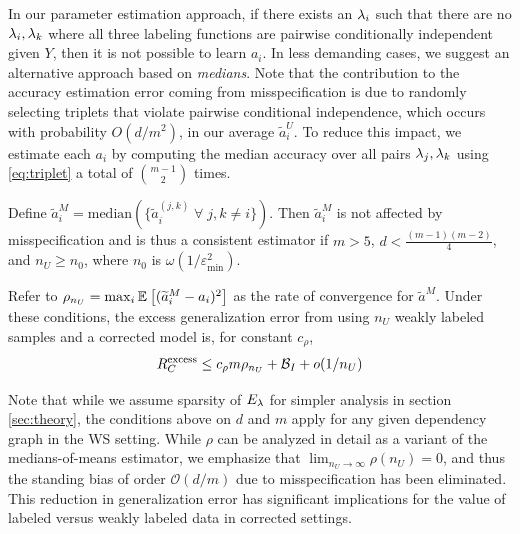 In our parameter estimation approach, if there exists an $\lambda_i$ such that there are no $\lambda_i, \lambda_k$ where all three labeling functions are pairwise conditionally independent given $Y$, then it is not possible to learn  $a_i$. In less demanding cases, %
we suggest an alternative approach based on \emph{medians}. Note that the contribution to the accuracy estimation error coming from misspecification is due to randomly selecting triplets that violate pairwise conditional independence, which occurs with probability $O(d/m^2)$, 
in our average $\widetilde{a}_i^U$. To reduce this impact, we estimate each $a_i$ by computing the median accuracy over all pairs $\lambda_j, \lambda_k$ using \eqref{eq:triplet} a total of ${m - 1 \choose 2}$ times.
\begin{proposition}
Define $\widetilde{a}_i^M = \mathrm{median}(\{\widetilde{a}_i^{(j, k)} \; \forall \; j, k \neq i \})$. Then $\widetilde{a}_i^M$ is not affected by misspecification and is thus a consistent estimator if $m > 5$, $d < \frac{(m - 1)(m - 2)}{4}$, and $n_U \ge n_0$, where $n_0$ is $\omega(1/\varepsilon_{\min}^2)$.

Refer to $\rho_{n_U} = \max_i \mathbb{E}_{}\left[(\widetilde{a}_i^M - a_i)^2\right]$ as the rate of convergence for $\widetilde{a}^M$. Under these conditions, the excess generalization error from using $n_U$ weakly labeled samples and a corrected model is, for constant $c_\rho$,
\begin{align}
    R_C^{\mathrm{excess}} \le c_\rho m  \rho_{n_U} + \mathcal{B}_I + o(1/n_U)
\end{align}
\label{prop:medians}
\end{proposition}

Note that while we assume sparsity of $E_{\lambda}$ for simpler analysis in section \ref{sec:theory}, the conditions above on $d$ and $m$ apply for any given dependency graph in the WS setting. While $\rho$ can be analyzed in detail as a variant of the medians-of-means estimator, we emphasize that $\lim_{n_U \rightarrow \infty} \rho(n_U) = 0$, and thus the standing bias of order $\mathcal{O}(d/m)$ due to misspecification has been eliminated. This reduction in generalization error has significant implications for the value of labeled versus weakly labeled data in corrected settings. %

